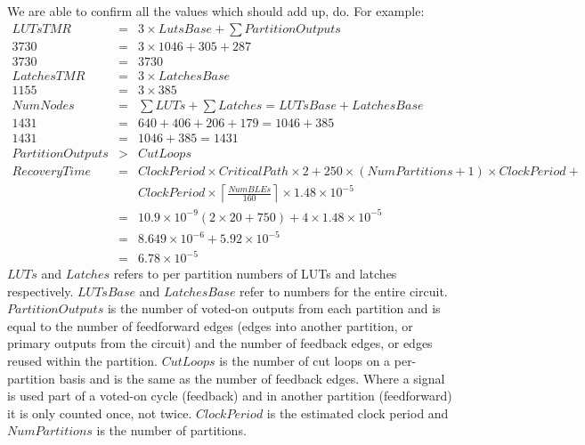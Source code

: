 \documentclass[12pt,final,oneside]{dwThesis} %
\begin{document}
   We are able to confirm all the values which should add up, do. For example:
   \begin{eqnarray*}
      LUTsTMR &=& 3\times LutsBase + \sum PartitionOutputs\\
      3730 &=& 3\times1046 + 305 + 287\\
      3730 &=& 3730\\
      LatchesTMR &=&  3\times LatchesBase\\
      1155 &=& 3\times385\\
      NumNodes &=& \sum LUTs+\sum Latches = LUTsBase+LatchesBase \\
      1431 &=& 640+406+206+179 = 1046+385\\
      1431 &=& 1046 + 385 = 1431\\
      PartitionOutputs &>& CutLoops\\
      RecoveryTime &=&
      ClockPeriod\times CriticalPath\times 2 + 250\times(NumPartitions+1)\times
      ClockPeriod + \\
      & &ClockPeriod\times \left\lceil
      \frac{NumBLEs}{160}\right\rceil\times 1.48\times10^{-5}\\
      &=&
      10.9\times10^{-9}(2\times20+750)+4\times1.48\times10^{-5}\\
      &=&
      8.649\times10^{-6}+5.92\times10^{-5}\\
      &=& 6.78\times10^{-5}
   \end{eqnarray*}
   $LUTs$ and $Latches$ refers to per partition numbers of \glspl{LUT} and latches respectively. $LUTsBase$ and $LatchesBase$ refer to numbers for the entire circuit.
   $PartitionOutputs$ is the number of voted-on outputs from each partition and is equal to the number of feedforward edges (edges into another partition, or primary outputs from the circuit) and the number of feedback edges, or edges reused within the partition. $CutLoops$ is the number of cut loops on a per-partition basis and is the same as the number of feedback edges. Where a signal is used part of a voted-on cycle (feedback) and in another partition (feedforward) it is only counted once, not twice.
   $ClockPeriod$ is the estimated clock period and $NumPartitions$ is the number of partitions.
   
\end{document}
